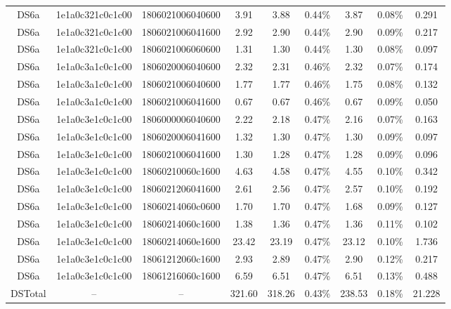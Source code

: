 \begin{tabular}{|c|c c|c|c c|c c|c|}
  DS6a & 1e1a0c321c0c1c00 & 1806021006040600 & 3.91 & 3.88 & 0.44\% & 3.87 & 0.08\% & 0.291 \\
  DS6a & 1e1a0c321c0c1c00 & 1806021006041600 & 2.92 & 2.90 & 0.44\% & 2.90 & 0.09\% & 0.217 \\
  DS6a & 1e1a0c321c0c1c00 & 1806021006060600 & 1.31 & 1.30 & 0.44\% & 1.30 & 0.08\% & 0.097 \\
  DS6a & 1e1a0c3a1c0c1c00 & 1806020006040600 & 2.32 & 2.31 & 0.46\% & 2.32 & 0.07\% & 0.174 \\
  DS6a & 1e1a0c3a1c0c1c00 & 1806021006040600 & 1.77 & 1.77 & 0.46\% & 1.75 & 0.08\% & 0.132 \\
  DS6a & 1e1a0c3a1c0c1c00 & 1806021006041600 & 0.67 & 0.67 & 0.46\% & 0.67 & 0.09\% & 0.050 \\
  DS6a & 1e1a0c3e1c0c1c00 & 1806000006040600 & 2.22 & 2.18 & 0.47\% & 2.16 & 0.07\% & 0.163 \\
  DS6a & 1e1a0c3e1c0c1c00 & 1806020006041600 & 1.32 & 1.30 & 0.47\% & 1.30 & 0.09\% & 0.097 \\
  DS6a & 1e1a0c3e1c0c1c00 & 1806021006041600 & 1.30 & 1.28 & 0.47\% & 1.28 & 0.09\% & 0.096 \\
  DS6a & 1e1a0c3e1c0c1c00 & 18060210060c1600 & 4.63 & 4.58 & 0.47\% & 4.55 & 0.10\% & 0.342 \\
  DS6a & 1e1a0c3e1c0c1c00 & 1806021206041600 & 2.61 & 2.56 & 0.47\% & 2.57 & 0.10\% & 0.192 \\
  DS6a & 1e1a0c3e1c0c1c00 & 18060214060c0600 & 1.70 & 1.70 & 0.47\% & 1.68 & 0.09\% & 0.127 \\
  DS6a & 1e1a0c3e1c0c1c00 & 18060214060c1600 & 1.38 & 1.36 & 0.47\% & 1.36 & 0.11\% & 0.102 \\
  DS6a & 1e1a0c3e1c0c1c00 & 18060214060e1600 & 23.42 & 23.19 & 0.47\% & 23.12 & 0.10\% & 1.736 \\
  DS6a & 1e1a0c3e1c0c1c00 & 18061212060c1600 & 2.93 & 2.89 & 0.47\% & 2.90 & 0.12\% & 0.217 \\
  DS6a & 1e1a0c3e1c0c1c00 & 18061216060c1600 & 6.59 & 6.51 & 0.47\% & 6.51 & 0.13\% & 0.488 \\
  DSTotal & -- & -- & 321.60 & 318.26 & 0.43\% & 238.53 & 0.18\% & 21.228 \\
\hline
\end{tabular}
